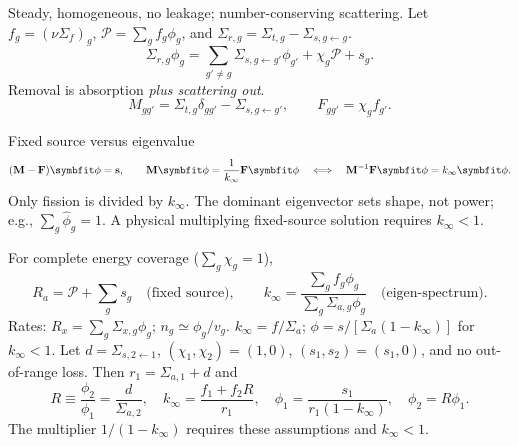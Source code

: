 \begin{handoutcolumns}
Steady, homogeneous, no leakage; number-conserving scattering.
Let $f_g=(\nu\Sigma_f)_g$, $\mathcal P=\sum_g f_g\phi_g$, and
$\Sigma_{r,g}=\Sigma_{t,g}-\Sigma_{s,g\gets g}$.
\[
 \Sigma_{r,g}\phi_g=\sum_{g'\ne g}\Sigma_{s,g\gets g'}\phi_{g'}
                         +\chi_g\mathcal P+s_g.
\]
Removal is absorption \emph{plus scattering out}.
\[
 M_{gg'}=\Sigma_{t,g}\delta_{gg'}-\Sigma_{s,g\gets g'},
 \qquad F_{gg'}=\chi_g f_{g'}.
\]
\begin{fixedbox}{Fixed source versus eigenvalue}
\[
 (\M-\F)\fv=\sv,\qquad
 \M\fv=\frac1{k_\infty}\F\fv
 \quad\Longleftrightarrow\quad\M^{-1}\F\fv=k_\infty\fv.
\]
Only fission is divided by $k_\infty$. The dominant eigenvector
sets shape, not power; e.g., $\sum_g\widehat\phi_g=1$.
A physical multiplying fixed-source solution requires $k_\infty<1$.
\end{fixedbox}
For complete energy coverage ($\sum_g\chi_g=1$),
\[
 R_a=\mathcal P+\sum_gs_g\quad\text{(fixed source)},\qquad
 k_\infty=\frac{\sum_g f_g\phi_g}{\sum_g\Sigma_{a,g}\phi_g}
 \quad\text{(eigen-spectrum)}.
\]
Rates: $R_x=\sum_g\Sigma_{x,g}\phi_g$; $n_g\simeq\phi_g/v_g$.
 $k_\infty=f/\Sigma_a$;
$\phi=s/[\Sigma_a(1-k_\infty)]$ for $k_\infty<1$.
 Let $d=\Sigma_{s,2\gets1}$,
$(\chi_1,\chi_2)=(1,0)$, $(s_1,s_2)=(s_1,0)$, and no
out-of-range loss. Then $r_1=\Sigma_{a,1}+d$ and
\[
 R\equiv\frac{\phi_2}{\phi_1}=\frac{d}{\Sigma_{a,2}},\quad
 k_\infty=\frac{f_1+f_2R}{r_1},\quad
 \phi_1=\frac{s_1}{r_1(1-k_\infty)},\quad\phi_2=R\phi_1.
\]
The multiplier $1/(1-k_\infty)$ requires these assumptions and $k_\infty<1$.
\end{handoutcolumns}


